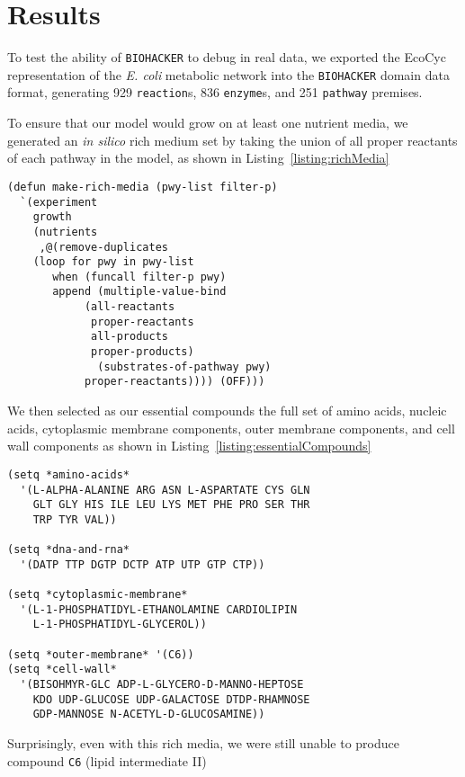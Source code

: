 \section{Results} 
To test the ability of {\tt BIOHACKER} to debug in real data, we
exported the EcoCyc\cite{ecocyc}\cite{romero2001} representation of the {\em E. coli}
metabolic network into the {\tt BIOHACKER} domain data format, generating
929 {\tt reaction}s, 836 {\tt enzyme}s, and 251 {\tt pathway} premises.

To ensure that our model would grow on at least one nutrient media, we generated an {\em in silico} rich medium
set by taking the union of all proper reactants of each pathway in the model, as shown in Listing~\ref{listing:richMedia}

\begin{lstlisting}[label={listing:richMedia},caption={{\em E. coli} rich media}]
(defun make-rich-media (pwy-list filter-p)
  `(experiment 
    growth 
    (nutrients 
     ,@(remove-duplicates 
	(loop for pwy in pwy-list
	   when (funcall filter-p pwy)
	   append (multiple-value-bind
			(all-reactants 
			 proper-reactants 
			 all-products 
			 proper-products)
		      (substrates-of-pathway pwy)
		    proper-reactants)))) (OFF)))
\end{lstlisting}

We then selected as our essential compounds the full set of amino acids, nucleic acids, cytoplasmic membrane components,
outer membrane components, and cell wall components as shown in Listing~\ref{listing:essentialCompounds}

\begin{lstlisting}[label={listing:essentialCompounds},caption={{\em E. coli} essential compounds}]
(setq *amino-acids*
  '(L-ALPHA-ALANINE ARG ASN L-ASPARTATE CYS GLN 
    GLT GLY HIS ILE LEU LYS MET PHE PRO SER THR 
    TRP TYR VAL))

(setq *dna-and-rna*
  '(DATP TTP DGTP DCTP ATP UTP GTP CTP))

(setq *cytoplasmic-membrane*
  '(L-1-PHOSPHATIDYL-ETHANOLAMINE CARDIOLIPIN 
    L-1-PHOSPHATIDYL-GLYCEROL))

(setq *outer-membrane* '(C6))
(setq *cell-wall*
  '(BISOHMYR-GLC ADP-L-GLYCERO-D-MANNO-HEPTOSE 
    KDO UDP-GLUCOSE UDP-GALACTOSE DTDP-RHAMNOSE 
    GDP-MANNOSE N-ACETYL-D-GLUCOSAMINE))
\end{lstlisting}

Surprisingly, even with this rich media, we were still unable to produce compound {\tt C6} (lipid intermediate II)

